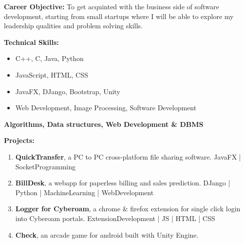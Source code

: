 \documentclass[11pt]{article}
\begin{document}
\begin{center}
\begin{minipage}[t]{0.4\textwidth}
		\end{minipage}%
		\begin{minipage}[t]{0.3\textwidth}
			\raggedright\smallskip
			\begin{LARGE}
				\textbf{Career Objective:}\medskip\linebreak%
				{\small To get acquinted with the business side of software development, starting from small startups where I will be able to explore my leadership qualities and problem solving skills.}\linebreak%
			\end{LARGE}
		\end{minipage}%
		\linebreak\linebreak\linebreak
		\begin{minipage}[t]{0.35\textwidth}
			\raggedright\smallskip
			\begin{LARGE}
				\textbf{Technical Skills:}\medskip%
				{\small
					\begin{itemize}
						\item C++, C, Java, Python
						\item JavaScript, HTML, CSS
						\item JavaFX, DJango, Bootstrap, Unity
						\item Web Development, Image Processing, Software Development
					\end{itemize}
				}
				\small \textbf{Algorithms, Data structures, Web Development \& DBMS}
			\end{LARGE}
		\end{minipage}%
		\begin{minipage}[t]{0.65\textwidth}
			\raggedright\smallskip
			\begin{LARGE}
				\textbf{Projects:}\medskip%
				{\small
					\begin{enumerate}
						\item \textbf{QuickTransfer}, a PC to PC cross-platform file sharing software.\linebreak
						JavaFX | SocketProgramming
						\item \textbf{BillDesk}, a webapp for paperless billing and sales prediction.
						DJango | Python | MachineLearning | WebDevelopment
						\item \textbf{Logger for Cyberoam}, a chrome \& firefox extension for single click login into Cyberoam portals.\linebreak
						ExtensionDevelopment | JS | HTML | CSS
						\item \textbf{Check}, an arcade game for android built with Unity Engine.\linebreak

\end{enumerate}}
\end{LARGE}
\end{minipage}
\end{center}
\end{document}
